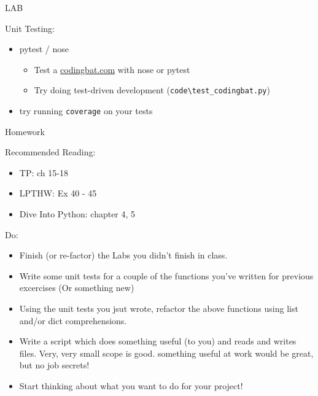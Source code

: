 \documentclass{beamer}
\begin{document}
\begin{frame}[fragile]{LAB}

{\Large Unit Testing:}

\begin{itemize}
  \item pytest / nose
    \begin{itemize}
       \item Test a \url{codingbat.com} with nose or pytest
       \item Try doing test-driven development
         (\verb|code\test_codingbat.py|)
    \end{itemize}

  \item try running \verb|coverage| on your tests
\end{itemize}

\end{frame}



\begin{frame}[fragile]{Homework}

Recommended Reading:
\begin{itemize}
  \item TP: ch 15-18
  \item LPTHW: Ex 40 - 45
  \item Dive Into Python: chapter 4, 5 
\end{itemize}

Do:
\begin{itemize}
  \item Finish (or re-factor) the Labs you didn't finish in class.
  \item Write some unit tests for a couple of the functions you've
        written for previous excercises (Or something new)
  \item Using the unit tests you jsut wrote, refactor the above functions
        using list and/or dict comprehensions.
  \item Write a script which does something useful (to you) and reads and writes
        files. Very, very small scope is good. something useful at work would
        be great, but no job secrets!
  \item Start thinking about what you want to do for your project!
\end{itemize}


\end{frame}
\end{document}
